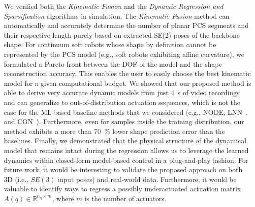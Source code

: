 We verified both the \emph{Kinematic Fusion} and the \emph{Dynamic Regression and Sparsification} algorithms in simulation. The \emph{Kinematic Fusion} method can automatically and accurately determine the number of planar \gls{PCS} segments and their respective length purely based on extracted SE(2) poses of the backbone shape. 
For continuum soft robots whose shape by definition cannot be represented by the \gls{PCS} model (e.g., soft robots exhibiting affine curvature), we formulated a Pareto front between the \gls{DOF} of the model and the shape reconstruction accuracy. This enables the user to easily choose the best kinematic model for a given computational budget.
We showed that our proposed method is able to derive very accurate dynamic models from just \SI{4}{s} of video recordings and can generalize to out-of-distribution actuation sequences, which is not the case for the \gls{ML}-based baseline methods that we considered (e.g., \gls{NODE}, \gls{LNN}~\cite{liu2024physics}, and \gls{CON}~\cite{stolzle2024input}).
Furthermore, even for samples inside the training distribution, our method exhibits a more than \SI{70}{\percent} lower shape prediction error than the baselines.
Finally, we demonstrated that the physical structure of the dynamical model that remains intact during the regression allows us to leverage the learned dynamics within closed-form model-based control in a plug-and-play fashion.
For future work, it would be interesting to validate the proposed approach on both 3D (i.e., $SE(3)$ input poses) and real-world data. Furthermore, it would be valuable to identify ways to regress a possibly underactuated actuation matrix $A(q) \in \mathbb{R}^{n_\mathrm{q} \times m}$, where $m$ is the number of actuators.
